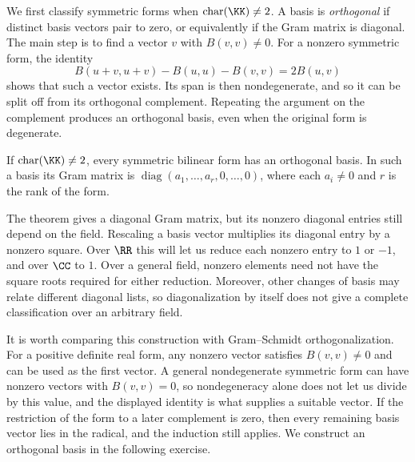 \documentclass[12pt,reqno]{amsart}
\DeclareMathOperator{\diag}{diag}
\begin{document}
\hrulefill

We first classify symmetric forms when $\operatorname{char}(\KK)\ne2$. A basis is \emph{orthogonal} if distinct basis vectors pair to zero, or equivalently if the Gram matrix is diagonal. The main step is to find a vector $v$ with $B(v,v)\ne0$. For a nonzero symmetric form, the identity
\[
B(u+v,u+v)-B(u,u)-B(v,v)=2B(u,v)
\]
shows that such a vector exists. Its span is then nondegenerate, and so it can be split off from its orthogonal complement. Repeating the argument on the complement produces an orthogonal basis, even when the original form is degenerate.

\begin{theorem}
If $\operatorname{char}(\KK)\ne2$, every symmetric bilinear form has an orthogonal basis. In such a basis its Gram matrix is $\diag(a_1,\ldots,a_r,0,\ldots,0)$, where each $a_i\ne0$ and $r$ is the rank of the form.
\end{theorem}

The theorem gives a diagonal Gram matrix, but its nonzero diagonal entries still depend on the field. Rescaling a basis vector multiplies its diagonal entry by a nonzero square. Over $\RR$ this will let us reduce each nonzero entry to $1$ or $-1$, and over $\CC$ to $1$. Over a general field, nonzero elements need not have the square roots required for either reduction. Moreover, other changes of basis may relate different diagonal lists, so diagonalization by itself does not give a complete classification over an arbitrary field.

It is worth comparing this construction with Gram--Schmidt orthogonalization. For a positive definite real form, any nonzero vector satisfies $B(v,v)\ne0$ and can be used as the first vector. A general nondegenerate symmetric form can have nonzero vectors with $B(v,v)=0$, so nondegeneracy alone does not let us divide by this value, and the displayed identity is what supplies a suitable vector. If the restriction of the form to a later complement is zero, then every remaining basis vector lies in the radical, and the induction still applies. We construct an orthogonal basis in the following exercise.

\hrulefill
\end{document}
